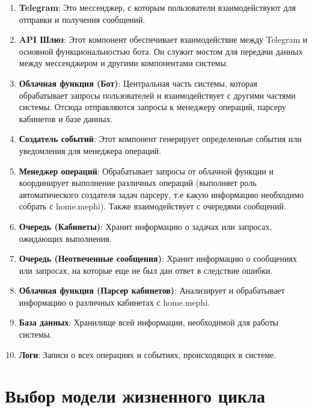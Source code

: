 \begin{enumerate}
    \item \textbf{Telegram}: Это мессенджер, с которым пользователи
взаимодействуют для отправки и получения сообщений.
    
    \item \textbf{API Шлюз}: Этот компонент обеспечивает взаимодействие между
Telegram и основной функциональностью бота. Он служит мостом для передачи данных
между мессенджером и другими компонентами системы.
    
    \item \textbf{Облачная функция (Бот)}: Центральная часть системы, которая
обрабатывает запросы пользователей и взаимодействует с другими частями системы.
Отсюда отправляются запросы к менеджеру операций, парсеру кабинетов и базе
данных.
    
    \item \textbf{Создатель событий}: Этот компонент генерирует определенные
события или уведомления для менеджера операций.
    
    \item \textbf{Менеджер операций}: Обрабатывает запросы от облачной функции и
координирует выполнение различных операций (выполняет роль автоматического
создателя задач парсеру, т.е какую информацию необходимо собрать с home.mephi).
Также взаимодействует с очередями сообщений.
    
    \item \textbf{Очередь (Кабинеты)}: Хранит информацию о задачах или запросах,
ожидающих выполнения.
    
    \item \textbf{Очередь (Неотвеченные сообщения)}: Хранит информацию о
сообщениях или запросах, на которые еще не был дан ответ в следствие ошибки.
    
    \item \textbf{Облачная функция (Парсер кабинетов)}: Анализирует и
обрабатывает информацию о различных кабинетах с home.mephi.
    
    \item \textbf{База данных}: Хранилище всей информации, необходимой для
работы системы.
    
    \item \textbf{Логи}: Записи о всех операциях и событиях, происходящих в
системе.
\end{enumerate}


\chapter{Выбор модели жизненного цикла}

